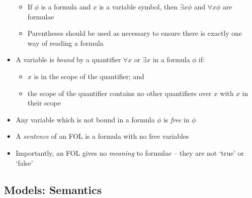 \begin{itemize}
\begin{itemize}
		\item If $ \phi $ is a formula and $ x $ is a variable symbol, then $ \exists x \phi $ and $ \forall x \phi $ are formulae
		
		\item Parentheses should be used as necessary to ensure there is exactly one way of reading a formula
		
	\end{itemize}

	\item A variable is \textit{bound} by a quantifier $ \forall x $ or $ \exists x $ in a formula $ \phi $ if:
	
	\begin{itemize}
		\item $ x $ is in the scope of the quantifier; and
		
		\item the scope of the quantifier contains no other quantifiers over $ x $ with $ x $ in their scope
	\end{itemize}

	\item Any variable which is not bound in a formula $ \phi $ is \textit{free} in $ \phi $
	
	\item A \textit{sentence} of an FOL is a formula with no free variables
	
	\item Importantly, an FOL gives no \textit{meaning} to formulae -- they are not `true' or `false'
		
\end{itemize}

\subsection{Models: Semantics}

